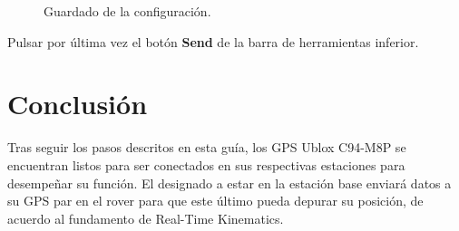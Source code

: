 \begin{figure}[H] %
\caption{Guardado de la configuración.}
\label{fig:SavAll}
\end{figure}

Pulsar por última vez el botón \textbf{Send} de la barra de herramientas inferior. 

\section{Conclusión}

Tras seguir los pasos descritos en esta guía, los GPS Ublox C94-M8P se encuentran listos para ser conectados en sus respectivas estaciones para desempeñar su función. El designado a estar en la estación base enviará datos a su GPS par en el rover para que este último pueda depurar su posición, de acuerdo al fundamento de Real-Time Kinematics.

%